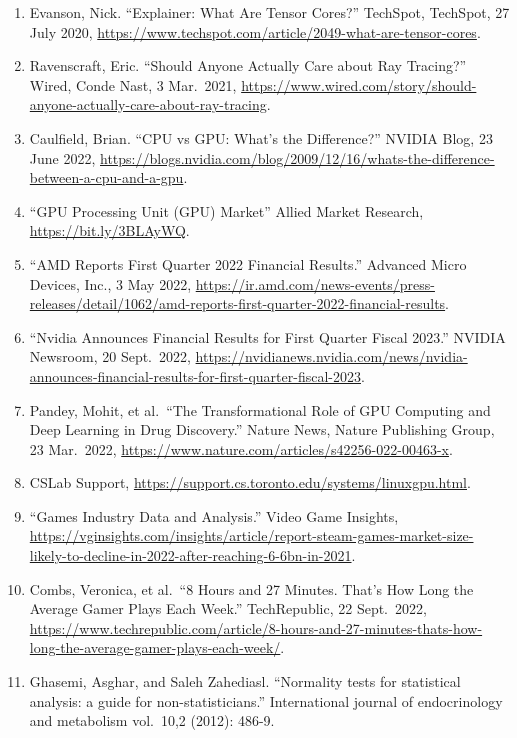 \documentclass[
]{article}
\providecommand{\tightlist}{%
  \setlength{\itemsep}{0pt}\setlength{\parskip}{0pt}}
\begin{document}
\begin{enumerate}
\def\labelenumi{\arabic{enumi}.}
\tightlist
\item
  Evanson, Nick. ``Explainer: What Are Tensor Cores?'' TechSpot,
  TechSpot, 27 July 2020,
  \url{https://www.techspot.com/article/2049-what-are-tensor-cores}.
\item
  Ravenscraft, Eric. ``Should Anyone Actually Care about Ray Tracing?''
  Wired, Conde Nast, 3 Mar.~2021,
  \url{https://www.wired.com/story/should-anyone-actually-care-about-ray-tracing}.
\item
  Caulfield, Brian. ``CPU vs GPU: What's the Difference?'' NVIDIA Blog,
  23 June 2022,
  \url{https://blogs.nvidia.com/blog/2009/12/16/whats-the-difference-between-a-cpu-and-a-gpu}.
\item
  ``GPU Processing Unit (GPU) Market'' Allied Market Research,
  \url{https://bit.ly/3BLAyWQ}.
\item
  ``AMD Reports First Quarter 2022 Financial Results.'' Advanced Micro
  Devices, Inc., 3 May 2022,
  \url{https://ir.amd.com/news-events/press-releases/detail/1062/amd-reports-first-quarter-2022-financial-results}.
\item
  ``Nvidia Announces Financial Results for First Quarter Fiscal 2023.''
  NVIDIA Newsroom, 20 Sept.~2022,
  \url{https://nvidianews.nvidia.com/news/nvidia-announces-financial-results-for-first-quarter-fiscal-2023}.
\item
  Pandey, Mohit, et al.~``The Transformational Role of GPU Computing and
  Deep Learning in Drug Discovery.'' Nature News, Nature Publishing
  Group, 23 Mar.~2022,
  \url{https://www.nature.com/articles/s42256-022-00463-x}.
\item
  CSLab Support,
  \url{https://support.cs.toronto.edu/systems/linuxgpu.html}.
\item
  ``Games Industry Data and Analysis.'' Video Game Insights,
  \url{https://vginsights.com/insights/article/report-steam-games-market-size-likely-to-decline-in-2022-after-reaching-6-6bn-in-2021}.
\item
  Combs, Veronica, et al.~``8 Hours and 27 Minutes. That's How Long the
  Average Gamer Plays Each Week.'' TechRepublic, 22 Sept.~2022,
  \url{https://www.techrepublic.com/article/8-hours-and-27-minutes-thats-how-long-the-average-gamer-plays-each-week/}.
\item
  Ghasemi, Asghar, and Saleh Zahediasl. ``Normality tests for
  statistical analysis: a guide for non-statisticians.'' International
  journal of endocrinology and metabolism vol.~10,2 (2012): 486-9.

\end{enumerate}
\end{document}
